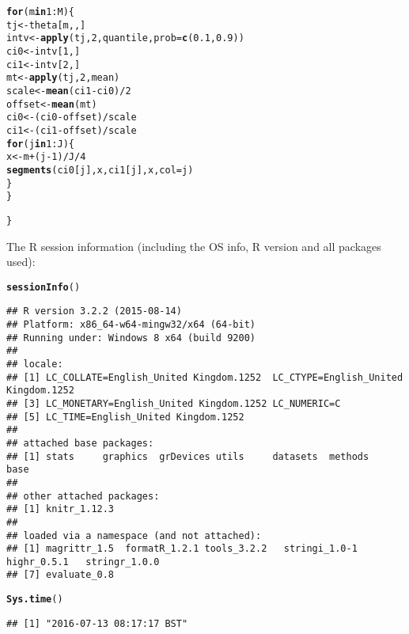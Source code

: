 \documentclass{article}\usepackage[]{graphicx}\usepackage[]{color}
\makeatletter
\newcommand{\hlnum}[1]{\textcolor[rgb]{0.686,0.059,0.569}{#1}}%
\newcommand{\hlopt}[1]{\textcolor[rgb]{0,0,0}{#1}}%
\newcommand{\hlstd}[1]{\textcolor[rgb]{0.345,0.345,0.345}{#1}}%
\newcommand{\hlkwa}[1]{\textcolor[rgb]{0.161,0.373,0.58}{\textbf{#1}}}%
\newcommand{\hlkwb}[1]{\textcolor[rgb]{0.69,0.353,0.396}{#1}}%
\newcommand{\hlkwc}[1]{\textcolor[rgb]{0.333,0.667,0.333}{#1}}%
\newcommand{\hlkwd}[1]{\textcolor[rgb]{0.737,0.353,0.396}{\textbf{#1}}}%
\newenvironment{kframe}{%
 \def\at@end@of@kframe{}%
 \ifinner\ifhmode%
  \def\at@end@of@kframe{\end{minipage}}%
  \begin{minipage}{\columnwidth}%
 \fi\fi%
 \def\FrameCommand##1{\hskip\@totalleftmargin \hskip-\fboxsep
 \colorbox{shadecolor}{##1}\hskip-\fboxsep
     \hskip-\linewidth \hskip-\@totalleftmargin \hskip\columnwidth}%
 \MakeFramed {\advance\hsize-\width
   \@totalleftmargin\z@ \linewidth\hsize
   \@setminipage}}%
 {\par\unskip\endMakeFramed%
 \at@end@of@kframe}
\newenvironment{knitrout}{}{} %
\makeatother
\begin{document}
\begin{knitrout}
\begin{kframe}
\begin{alltt}
  \hlkwa{for} \hlstd{(m} \hlkwa{in} \hlnum{1}\hlopt{:}\hlstd{M) \{}
    \hlstd{tj} \hlkwb{<-} \hlstd{theta[m,,]}
    \hlstd{intv} \hlkwb{<-} \hlkwd{apply}\hlstd{(tj,} \hlnum{2}\hlstd{, quantile,} \hlkwc{prob}\hlstd{=}\hlkwd{c}\hlstd{(}\hlnum{0.1}\hlstd{,}\hlnum{0.9}\hlstd{))}
    \hlstd{ci0} \hlkwb{<-} \hlstd{intv[}\hlnum{1}\hlstd{,]}
    \hlstd{ci1} \hlkwb{<-} \hlstd{intv[}\hlnum{2}\hlstd{,]}
    \hlstd{mt} \hlkwb{<-} \hlkwd{apply}\hlstd{(tj,} \hlnum{2}\hlstd{, mean)}
    \hlstd{scale} \hlkwb{<-} \hlkwd{mean}\hlstd{(ci1}\hlopt{-}\hlstd{ci0)}\hlopt{/}\hlnum{2}
    \hlstd{offset} \hlkwb{<-} \hlkwd{mean}\hlstd{(mt)}
    \hlstd{ci0} \hlkwb{<-} \hlstd{(ci0} \hlopt{-} \hlstd{offset)}\hlopt{/}\hlstd{scale}
    \hlstd{ci1} \hlkwb{<-} \hlstd{(ci1} \hlopt{-} \hlstd{offset)}\hlopt{/}\hlstd{scale}
    \hlkwa{for} \hlstd{(j} \hlkwa{in} \hlnum{1}\hlopt{:}\hlstd{J) \{}
      \hlstd{x} \hlkwb{<-} \hlstd{m} \hlopt{+} \hlstd{(j}\hlopt{-}\hlnum{1}\hlstd{)}\hlopt{/}\hlstd{J}\hlopt{/}\hlnum{4}
      \hlkwd{segments}\hlstd{(ci0[j], x,ci1[j], x,} \hlkwc{col}\hlstd{=j)}
    \hlstd{\}}
  \hlstd{\}}

\hlstd{\}}
\end{alltt}
\end{kframe}
\end{knitrout}

The R session information (including the OS info, R version and all
packages used):

\begin{knitrout}
\color{fgcolor}\begin{kframe}
\begin{alltt}
\hlkwd{sessionInfo}\hlstd{()}
\end{alltt}
\begin{verbatim}
## R version 3.2.2 (2015-08-14)
## Platform: x86_64-w64-mingw32/x64 (64-bit)
## Running under: Windows 8 x64 (build 9200)
## 
## locale:
## [1] LC_COLLATE=English_United Kingdom.1252  LC_CTYPE=English_United Kingdom.1252   
## [3] LC_MONETARY=English_United Kingdom.1252 LC_NUMERIC=C                           
## [5] LC_TIME=English_United Kingdom.1252    
## 
## attached base packages:
## [1] stats     graphics  grDevices utils     datasets  methods   base     
## 
## other attached packages:
## [1] knitr_1.12.3
## 
## loaded via a namespace (and not attached):
## [1] magrittr_1.5  formatR_1.2.1 tools_3.2.2   stringi_1.0-1 highr_0.5.1   stringr_1.0.0
## [7] evaluate_0.8
\end{verbatim}
\begin{alltt}
\hlkwd{Sys.time}\hlstd{()}
\end{alltt}
\begin{verbatim}
## [1] "2016-07-13 08:17:17 BST"
\end{verbatim}
\end{kframe}
\end{knitrout}
\end{document}
